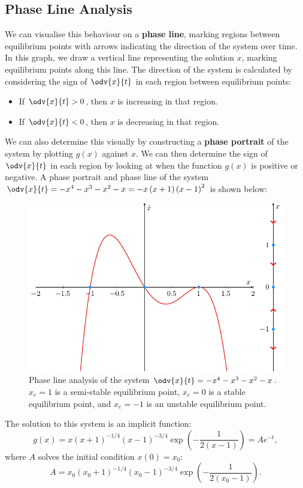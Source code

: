 \documentclass{article}
\begin{document}
\subsection{Phase Line Analysis}
We can visualise this behaviour on a \textbf{phase line}, marking
regions between equilibrium points with arrows indicating the direction
of the system over time. In this graph, we draw a vertical line
representing the solution \(x\), marking equilibrium points along this
line. The direction of the system is calculated by considering the sign
of \(\odv{x}{t}\) in each region between equilibrium points:
\begin{itemize}
    \item If \(\odv{x}{t} > 0\), then \(x\) is increasing in that
          region.
    \item If \(\odv{x}{t} < 0\), then \(x\) is decreasing in that
          region.
\end{itemize}
We can also determine this visually by constructing a
\textbf{phase portrait} of the system by plotting \(g\left( x \right)\)
against \(x\). We can then determine the sign of \(\odv{x}{t}\) in each
region by looking at when the function \(g\left( x \right)\) is positive
or negative. A phase portrait and phase line of the system
\(\odv{x}{t} = -x^4 - x^3 - x^2 - x = -x \left( x + 1 \right) \left( x - 1 \right)^2\) is shown below:
\begin{figure}[H]
    \centering
    \includegraphics[width = 0.8\linewidth]{figures/phase_line_analysis.pdf}
    \caption{Phase line analysis of the system \(\odv{x}{t} = -x^4 - x^3 - x^2 - x\).
        \(x_e = 1\) is a semi-stable equilibrium point, \(x_e = 0\) is a stable
        equilibrium point, and \(x_e = -1\) is an unstable equilibrium point.}
\end{figure}
The solution to this system is an implicit function:
\begin{equation*}
    g\left( x \right) = x \left( x+1 \right)^{-1/4} \left( x-1 \right)^{-3/4} \exp\left( -\frac{1}{2\left( x-1 \right)} \right) = A e^{-t},
\end{equation*}
where \(A\) solves the initial condition \(x\left( 0 \right) = x_0\):
\begin{equation*}
    A = x_0 \left( x_0 + 1 \right)^{-1/4} \left( x_0 - 1 \right)^{-3/4} \exp\left( -\frac{1}{2\left( x_0 - 1 \right)} \right).
\end{equation*}
\end{document}
